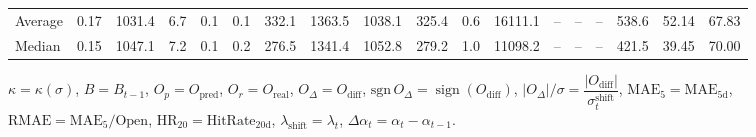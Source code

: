 \begin{threeparttable}
{\begin{tabular}{lrrrrrrrrrrrrrrrrr}
Average &     0.17 & 1031.4 &               6.7 &               0.1 &                0.1 &              332.1 & 1363.5 & 1038.1 &      325.4 &                      0.6 &             16111.1 &         -- &        -- &             -- &            538.6 &           52.14 &                  67.83 \\
 Median &     0.15 & 1047.1 &               7.2 &               0.1 &                0.2 &              276.5 & 1341.4 & 1052.8 &      279.2 &                      1.0 &             11098.2 &         -- &        -- &             -- &            421.5 &           39.45 &                  70.00 \\
\bottomrule
\end{tabular}
}
\begin{tablenotes}\footnotesize
\item $\kappa=\kappa(\sigma)$, $B=B_{t-1}$, $O_p=O_{\text{pred}}$, $O_r=O_{\text{real}}$, $O_\Delta=O_{\text{diff}}$, $\mathrm{sgn}\,O_\Delta=\operatorname{sign}(O_{\text{diff}})$, $|O_\Delta|/\sigma=\dfrac{|O_{\text{diff}}|}{\sigma_t^{\text{shift}}}$, $\mathrm{MAE}_5=\mathrm{MAE}_{5\text{d}}$, $\mathrm{RMAE}= \mathrm{MAE}_5 / \text{Open}$, $\mathrm{HR}_{20}=\mathrm{HitRate}_{20\text{d}}$, 
$\lambda_{\text{shift}}=\lambda_t$, 
$\Delta\alpha_t=\alpha_t-\alpha_{t-1}$.
\end{tablenotes}
\end{threeparttable}
\endgroup

